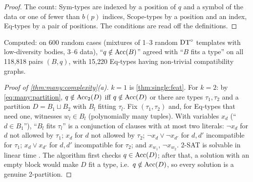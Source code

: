 \begin{proof}
The count: Sym-types are indexed by a position of $q$ and a symbol of the data or one of fewer than $b(p)$ indices,
Scope-types by a position and an index, Eq-types by a pair of positions. The conditions are read off the definitions.
\end{proof}
Computed: on 600 random cases (mixtures of 1--3 random $\mathrm{DT}^{\circ}$ templates with low-diversity bodies, 3--6 data),
``$q\notin\mathrm{Acc}(B)$'' agreed with ``$B$ fits a type'' on all 118{,}818 pairs $(B,q)$, with 15{,}220 Eq-types having
non-trivial compatibility graphs.

\begin{proof}[Proof of \cref{thm:many:complexity}(a)]
$k=1$ is \cref{thm:single:feat}. For $k=2$: by \eqref{eq:many:partition}, $q\notin\mathrm{Acc}_2(D)$ iff $q\notin\mathrm{Acc}(D)$ or there are
types $\tau_1,\tau_2$ and a partition $D=B_1\sqcup B_2$ with $B_l$ fitting $\tau_l$. Fix $(\tau_1,\tau_2)$ and, for Eq-types that
need one, witnesses $w_l\in B_l$ (polynomially many tuples). With variables $x_d$ (``$d\in B_1$''), ``$B_l$ fits $\tau_l$'' is
a conjunction of clauses with at most two literals: $\neg x_d$ for $d$ not allowed by $\tau_1$; $x_d$ for $d$ not allowed by
$\tau_2$; $\neg x_d\vee\neg x_{d'}$ for $d,d'$ incompatible for $\tau_1$; $x_d\vee x_{d'}$ for $d,d'$ incompatible for $\tau_2$;
and $x_{w_1}$, $\neg x_{w_2}$. 2-SAT is solvable in linear time \citep{aspvall1979linear}. The algorithm first checks $q\in
\mathrm{Acc}(D)$; after that, a solution with an empty block would make $D$ fit a type, i.e.\ $q\notin\mathrm{Acc}(D)$, so every solution is a
genuine 2-partition.
\end{proof}

